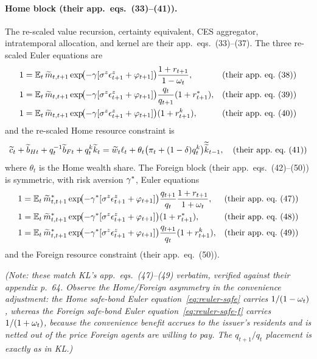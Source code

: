 \paragraph{Home block (their app.\ eqs.~(33)--(41)).} The re-scaled value
recursion, certainty equivalent, CES aggregator, intratemporal allocation, and
kernel are their app.\ eqs.~(33)--(37). The three re-scaled Euler equations are
\begin{align}
\label{eq:reuler-safe}
1&=\Et\,\rs{\pk}_{t,t+1}\exp\!\bigl(-\rra[\sigma^z\epsilon^z_{t+1}+\varphi_{t+1}]\bigr)
\frac{1+\rr_{t+1}}{1-\cy_t}, &&\text{(their app.\ eq.~(38))}\\
\label{eq:reuler-uip}
1&=\Et\,\rs{\pk}_{t,t+1}\exp\!\bigl(-\rra[\sigma^z\epsilon^z_{t+1}+\varphi_{t+1}]\bigr)
\frac{\rer_t}{\rer_{t+1}}(1+\fr{r}_{t+1}), &&\text{(their app.\ eq.~(39))}\\
\label{eq:reuler-cap}
1&=\Et\,\rs{\pk}_{t,t+1}\exp\!\bigl(-\rra[\sigma^z\epsilon^z_{t+1}+\varphi_{t+1}]\bigr)
(1+\rk_{t+1}), &&\text{(their app.\ eq.~(40))}
\end{align}
and the re-scaled Home resource constraint is
\begin{equation}
\label{eq:rbudget-home}
\widetilde{c}_t+\widetilde{b}_{Ht}+q_t^{-1}\widetilde{b}_{Ft}+q^{k}_t\widetilde{k}_t
=\widetilde{w}_t\ell_t+\theta_t\bigl(\pi_t+(1-\delta)q^{k}_t\bigr)\widetilde{\widetilde{k}}_{t-1},
\quad\text{(their app.\ eq.~(41))}
\end{equation}
where $\theta_t$ is the Home wealth share. The Foreign block (their app.\
eqs.~(42)--(50)) is symmetric, with risk aversion $\gamma^{*}$, Euler equations
\begin{align}
\label{eq:reuler-safe-f}
1&=\Et\,\rs{\pk}^{*}_{t,t+1}\exp\!\bigl(-\rraF[\sigma^z\epsilon^z_{t+1}+\varphi_{t+1}]\bigr)
\frac{\rer_{t+1}}{\rer_t}\frac{1+\rr_{t+1}}{1+\cy_t}, &&\text{(their app.\ eq.~(47))}\\
\label{eq:reuler-uip-f}
1&=\Et\,\rs{\pk}^{*}_{t,t+1}\exp\!\bigl(-\rraF[\sigma^z\epsilon^z_{t+1}+\varphi_{t+1}]\bigr)
(1+\fr{r}_{t+1}), &&\text{(their app.\ eq.~(48))}\\
\label{eq:reuler-cap-f}
1&=\Et\,\rs{\pk}^{*}_{t,t+1}\exp\!\bigl(-\rraF[\sigma^z\epsilon^z_{t+1}+\varphi_{t+1}]\bigr)
\frac{\rer_{t+1}}{\rer_t}(1+\rk_{t+1}), &&\text{(their app.\ eq.~(49))}
\end{align}
and the Foreign resource constraint (their app.\ eq.~(50)).

\noindent\emph{(Note: these match KL's app.\ eqs.\ (47)--(49) verbatim, verified
against their appendix p.~64. Observe the Home/Foreign asymmetry in the
convenience adjustment: the Home safe-bond Euler equation~\eqref{eq:reuler-safe}
carries $1/(1-\omega_t)$, whereas the Foreign safe-bond Euler
equation~\eqref{eq:reuler-safe-f} carries $1/(1+\omega_t)$, because the convenience
benefit accrues to the issuer's residents and is netted out of the price Foreign
agents are willing to pay. The $q_{t+1}/q_t$ placement is exactly as in KL.)}

